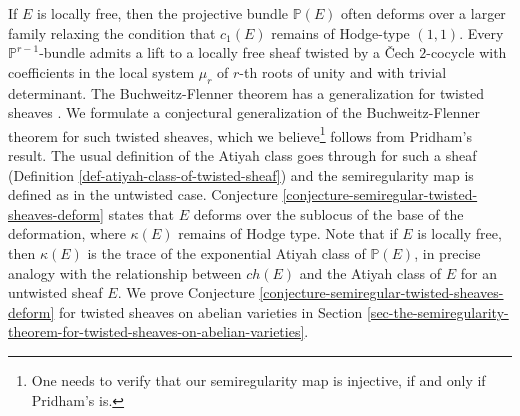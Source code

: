 \documentclass[12pt]{amsart}
\numberwithin{equation}{subsection}
\theoremstyle{plain}
\theoremstyle{definition}
\newcommand{\PP}{{\mathbb P}}
\begin{document}
If $E$ is locally free, then the projective bundle $\PP(E)$ often deforms over a larger family relaxing the condition that $c_1(E)$ remains of Hodge-type $(1,1)$.   
Every $\PP^{r-1}$-bundle admits a lift to a locally free sheaf twisted by a \v{C}ech $2$-cocycle with coefficients in the local system $\mu_r$ of $r$-th roots of unity and with trivial determinant. The Buchweitz-Flenner theorem has a generalization for twisted sheaves \cite[Remark 2.6]{pridham}. 
We formulate a conjectural generalization of the Buchweitz-Flenner theorem for such twisted sheaves, which we believe\footnote{One needs to verify that our semiregularity map is injective, if and only if Pridham's is.} follows from Pridham's result. The usual definition of the Atiyah class goes through for such a sheaf (Definition \ref{def-atiyah-class-of-twisted-sheaf}) and the semiregularity map is defined as in the untwisted case. Conjecture \ref{conjecture-semiregular-twisted-sheaves-deform} states that $E$ deforms over the sublocus of the base of the deformation, where $\kappa(E)$ remains of Hodge type. Note that if $E$ is locally free, then $\kappa(E)$ is the trace of the exponential Atiyah class of $\PP(E)$, in precise analogy with the relationship between $ch(E)$ and the Atiyah class of $E$ for an untwisted sheaf $E$. We prove Conjecture \ref{conjecture-semiregular-twisted-sheaves-deform} for twisted sheaves on abelian varieties in Section \ref{sec-the-semiregularity-theorem-for-twisted-sheaves-on-abelian-varieties}.
\end{document}
